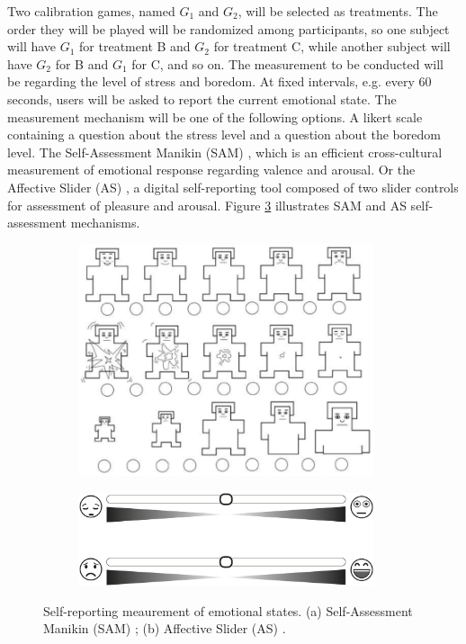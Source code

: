 Two calibration games, named $G_1$ and $G_2$, will be selected as treatments. The order they will be played will be randomized among participants, so one subject will have $G_1$ for treatment B and $G_2$ for treatment C, while another subject will have $G_2$ for B and $G_1$ for C, and so on. The measurement to be conducted will be regarding the level of stress and boredom. At fixed intervals, e.g. every 60 seconds, users will be asked to report the current emotional state. The measurement mechanism will be one of the following options. A likert scale containing a question about the stress level and a question about the boredom level. The Self-Assessment Manikin (SAM) \parencite{morris1995observations}, which is an efficient cross-cultural measurement of emotional response regarding valence and arousal. Or the Affective Slider (AS) \parencite{betella2016affective}, a digital self-reporting tool composed of two slider controls for assessment of pleasure and arousal. Figure \ref{fig:sam-as} illustrates SAM and AS self-assessment mechanisms.

\begin{figure}[h]
\centering
  \begin{subfigure}[b]{0.5\textwidth}
    \includegraphics[width=0.95\textwidth]{figures/SAM.png}
    \caption{}
    \label{fig:sam}
  \end{subfigure}%
  \begin{subfigure}[b]{0.5\textwidth}
    \centering
    \includegraphics[width=0.95\textwidth]{figures/AS.png}
    \caption{}
    \label{fig:as}
  \end{subfigure}
  \caption{Self-reporting meaurement of emotional states. (a) Self-Assessment Manikin (SAM) \parencite{morris1995observations}; (b) Affective Slider (AS) \parencite{betella2016affective}.}
  \label{fig:sam-as}
\end{figure}

